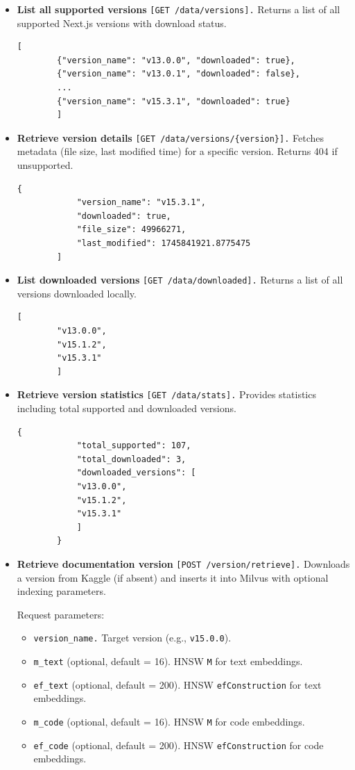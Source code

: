 \begin{itemize}
	
	\item \textbf{List all supported versions} \texttt{[GET /data/versions].}  
	Returns a list of all supported Next.js versions with download status.
	\begin{lstlisting}[caption=GET /data/versions output example]
		[
		{"version_name": "v13.0.0", "downloaded": true},
		{"version_name": "v13.0.1", "downloaded": false},
		...
		{"version_name": "v15.3.1", "downloaded": true}
		]\end{lstlisting}
	
	\item \textbf{Retrieve version details} \texttt{[GET /data/versions/\{version\}].}  
	Fetches metadata (file size, last modified time) for a specific version. Returns 404 if unsupported.
	\begin{lstlisting}[caption=GET /data/versions/{version} output example]
		{
			"version_name": "v15.3.1",
			"downloaded": true,
			"file_size": 49966271,
			"last_modified": 1745841921.8775475
		]\end{lstlisting}
	
	\item \textbf{List downloaded versions} \texttt{[GET /data/downloaded].}
	Returns a list of all versions downloaded locally.
	\begin{lstlisting}[caption=GET /data/downloaded output example]
		[
		"v13.0.0",
		"v15.1.2",
		"v15.3.1"
		]\end{lstlisting}
	
	\item \textbf{Retrieve version statistics} \texttt{[GET /data/stats].}  
	Provides statistics including total supported and downloaded versions.
	\begin{lstlisting}[caption=GET /data/stats output example]
		{
			"total_supported": 107,
			"total_downloaded": 3,
			"downloaded_versions": [
			"v13.0.0",
			"v15.1.2",
			"v15.3.1"
			]
		}\end{lstlisting}
	
	\item \textbf{Retrieve documentation version} \texttt{[POST /version/retrieve].} 
	Downloads a version from Kaggle (if absent) and inserts it into Milvus with optional indexing parameters.
	
	Request parameters:
	\begin{itemize}
		\item \texttt{version\_name.} Target version (e.g., \texttt{v15.0.0}).
		\item \texttt{m\_text} (optional, default = 16). HNSW \texttt{M} for text embeddings.
		\item \texttt{ef\_text} (optional, default = 200). HNSW \texttt{efConstruction} for text embeddings.
		\item \texttt{m\_code} (optional, default = 16). HNSW \texttt{M} for code embeddings.
		\item \texttt{ef\_code} (optional, default = 200). HNSW \texttt{efConstruction} for code embeddings.
	\end{itemize}
	

\end{itemize}

